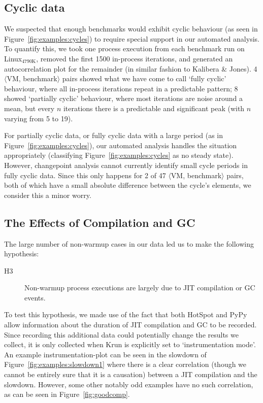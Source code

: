 \documentclass[acmlarge]{acmart}\settopmatter{printfolios=true}
\newcommand{\kalibera}{Kalibera \& Jones\xspace}
\newcommand{\krun}{Krun\xspace}
\newcommand{\bencherthree}{Linux$_\mathrm{4790K}$\xspace}
\newcommand{\vmbpair}{$\langle$VM, benchmark$\rangle$\xspace}
\begin{document}
\subsection{Cyclic data}
\label{sec:cyclic}

We suspected that enough benchmarks
would exhibit cyclic behaviour (as seen in Figure~\ref{fig:examples:cycles}) to
require special support in our automated analysis. To quantify this, we took one process
execution from each benchmark run on \bencherthree, removed the first 1500
in-process iterations, and generated an autocorrelation plot for the remainder
(in similar fashion to \kalibera). 4 \vmbpair pairs showed what we have come to
call `fully cyclic' behaviour, where all in-process iterations repeat in a
predictable pattern; 8 showed `partially cyclic' behaviour, where
most iterations are noise around a mean, but every $n$ iterations there is a
predictable and significant peak (with $n$ varying from 5 to 19).

For partially cyclic data, or fully cyclic data with a large period (as in
Figure~\ref{fig:examples:cycles}), our automated analysis handles the situation
appropriately (classifying Figure~\ref{fig:examples:cycles} as no steady state).
However, changepoint analysis cannot currently identify small cycle periods in
fully cyclic data. Since this only happens for 2
of 47 \vmbpair pairs, both of which have a small absolute difference between the
cycle's elements, we consider this a minor worry.


\subsection{The Effects of Compilation and GC}
\label{sec:deepdive}

The large number of non-warmup cases in our data led us to make the following hypothesis:
\begin{description}
  \item[H3] Non-warmup process executions are largely due to JIT compilation or GC events.
\end{description}
To test this hypothesis, we made use of the fact that both HotSpot and PyPy allow
information about the duration of JIT compilation and GC to be recorded. Since
recording this additional data could potentially change the results we collect,
it is only collected when \krun is explicitly set to `instrumentation mode'. An
example instrumentation-plot can be seen in the slowdown of
Figure~\ref{fig:examples:slowdown1} where there is a clear correlation (though we
cannot be entirely sure that it is a causation) between a JIT compilation and
the slowdown. However, some other notably odd examples have no such correlation,
as can be seen in Figure~\ref{fig:goodcomp}.
\end{document}

